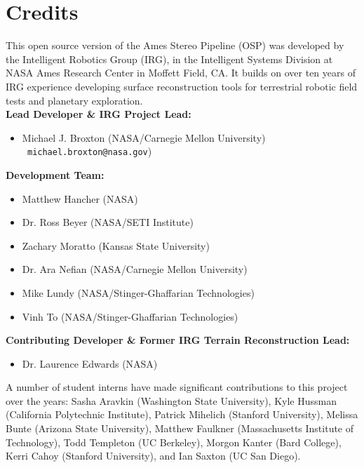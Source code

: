 
\chapter*{Credits}

This open source version of the Ames Stereo Pipeline (OSP) was
developed by the Intelligent Robotics Group (IRG), in the Intelligent
Systems Division at NASA Ames Research Center in Moffett Field, CA. It
builds on over ten years of IRG experience developing surface
reconstruction tools for terrestrial robotic field tests and planetary
exploration. \\

{\bf Lead Developer \& IRG Project Lead:}
\begin {itemize} 
\item Michael J. Broxton (NASA/Carnegie Mellon University)\\ {\tt
  michael.broxton@nasa.gov})\\
\end{itemize}

{\bf Development Team:}
\begin{itemize}
\item Matthew Hancher (NASA)
\item Dr. Ross Beyer (NASA/SETI Institute)
\item Zachary Moratto (Kansas State University)
\item Dr. Ara Nefian (NASA/Carnegie Mellon University)
\item Mike Lundy (NASA/Stinger-Ghaffarian Technologies)\\
\item Vinh To (NASA/Stinger-Ghaffarian Technologies)
\end{itemize}

{\bf Contributing Developer \& Former IRG Terrain Reconstruction Lead:}
\begin{itemize}
\item Dr. Laurence Edwards (NASA)
\end{itemize}

A number of student interns have made significant contributions to
this project over the years: Sasha Aravkin (Washington State
University), Kyle Hussman (California Polytechnic Institute), Patrick
Mihelich (Stanford University), Melissa Bunte (Arizona State
University), Matthew Faulkner (Massachusetts Institute of Technology),
Todd Templeton (UC Berkeley), Morgon Kanter (Bard College), Kerri
Cahoy (Stanford University), and Ian Saxton (UC San Diego).

